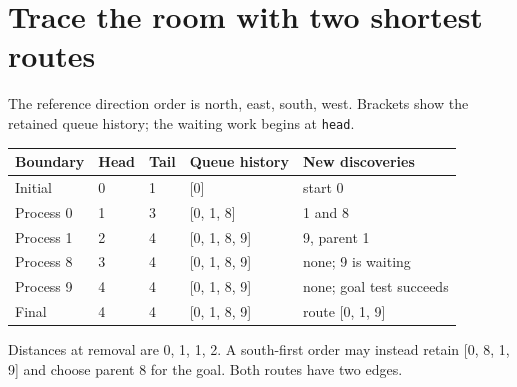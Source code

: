 \section{Trace the room with two shortest routes}\label{maze-x-queue-trace}
The reference direction order is north, east, south, west. Brackets show the retained
queue history; the waiting work begins at \texttt{head}.
\begin{longtable}{@{}p{35mm}p{17mm}p{17mm}p{47mm}p{40mm}@{}}
  \toprule
  Boundary  & Head & Tail & Queue history & New discoveries          \\\midrule\endhead
  Initial   & 0    & 1    & [0]           & start 0                  \\
  Process 0 & 1    & 3    & [0, 1, 8]     & 1 and 8                  \\
  Process 1 & 2    & 4    & [0, 1, 8, 9]  & 9, parent 1              \\
  Process 8 & 3    & 4    & [0, 1, 8, 9]  & none; 9 is waiting       \\
  Process 9 & 4    & 4    & [0, 1, 8, 9]  & none; goal test succeeds \\
  Final     & 4    & 4    & [0, 1, 8, 9]  & route [0, 1, 9]          \\
  \bottomrule
\end{longtable}
Distances at removal are 0, 1, 1, 2. A south-first order may instead retain
  [0, 8, 1, 9] and choose parent 8 for the goal. Both routes have two edges.
